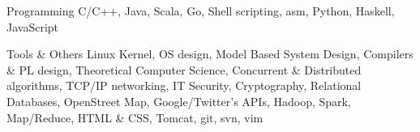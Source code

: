 


\begin{cvskills}


\cvskill
{Programming} %
{C/C++, Java, Scala, Go, Shell scripting, asm, Python, Haskell, JavaScript} %

\cvskill
{}{}

\cvskill
{Tools \& Others} %
{Linux Kernel, OS design, Model Based System Design, Compilers \& PL design, Theoretical Computer Science, Concurrent \& Distributed algorithms, TCP/IP networking, IT Security, Cryptography, Relational Databases, OpenStreet Map, Google/Twitter's APIs, Hadoop, Spark, Map/Reduce, HTML \& CSS, Tomcat, git, svn, vim} %

\end{cvskills}